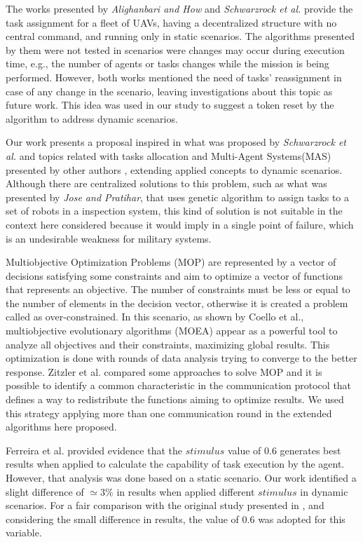 The works presented by \textit{Alighanbari and How}\cite{alighanbari2005decentralized} and \textit{Schwarzrock et al.}\cite{MAS07} provide the task assignment for a fleet of UAVs, having a decentralized structure with no central command, and running only in static scenarios. The algorithms presented by them were not tested in scenarios were changes may occur during  execution time, e.g., the number of agents or tasks changes while the mission is being performed. However, both works mentioned the need of tasks' reassignment in case of any  change in the scenario, leaving investigations about this topic as future work. This idea was used in our study to suggest a token reset by the algorithm to address dynamic scenarios.

Our work presents a proposal inspired in what was proposed by \textit{Schwarzrock et al.}\cite{MAS07} and topics related with tasks allocation and Multi-Agent Systems(MAS) presented by other authors \cite{MAS01, MAS02, MAS03, MAS04, MAS05, MAS06}, extending applied concepts to dynamic scenarios. Although there are centralized solutions to this problem, such as what was presented by \textit{Jose and Pratihar}\cite{jose2016task}, that uses genetic algorithm to assign tasks to a set of robots in a inspection system, this kind of solution is not suitable in the context here considered because it would imply in a single point of failure, which is an undesirable weakness for military systems.

Multiobjective Optimization Problems (MOP) are represented by a vector of decisions satisfying some constraints and aim to optimize a vector of functions that represents an objective. The number of constraints must be less or equal to the number of elements in the decision vector, otherwise it is created a problem called as over-constrained. In this scenario, as shown by Coello et al.\cite{MOEA01},  multiobjective evolutionary algorithms (MOEA) appear as a powerful tool to analyze all objectives and their constraints, maximizing global results. This optimization is done with rounds of data analysis trying to converge to the better response. Zitzler et al.\cite{07} compared some approaches to solve MOP and it is possible to identify a common characteristic in the communication protocol that defines a way to redistribute the functions aiming to optimize results. We used this strategy applying more than one communication round in the extended algorithms here proposed.

Ferreira et al. \cite{ferreira2007swarm} provided evidence that the $stimulus$ value of $0.6$ generates best results when applied to calculate the capability of task execution by the agent. However, that analysis was done based on a static scenario. Our work identified a slight difference of $\simeq 3\%$ in results when applied different $stimulus$ in dynamic scenarios. For a fair comparison with the original study presented in \cite{MAS07}, and considering the small difference in results, the value of $0.6$ was adopted for this variable.

